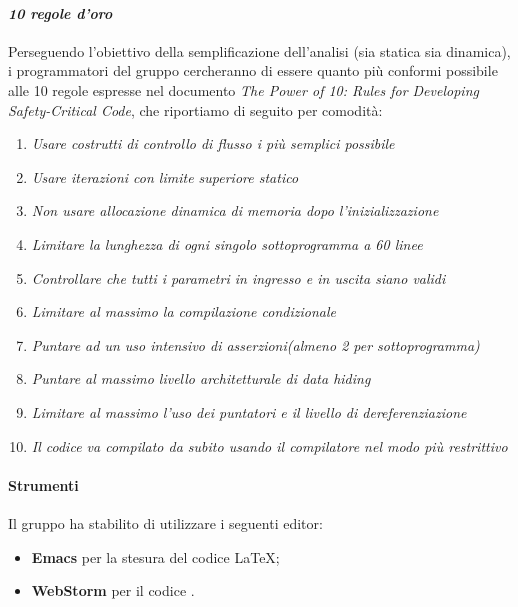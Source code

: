 		\paragraph*{\textit{10 regole d'oro}}
		Perseguendo l'obiettivo della semplificazione dell'analisi (sia statica sia dinamica),
           	i programmatori del gruppo cercheranno di essere quanto più conformi possibile alle 10 regole
           	espresse nel documento \textit{The Power of 10: Rules for Developing Safety-Critical Code}, che riportiamo di seguito per comodità:
                	\begin{enumerate}
                        	\item \textit{Usare costrutti di controllo di flusso i più semplici possibile}
                        	\item \textit{Usare iterazioni con limite superiore statico}
                        	\item \textit{Non usare allocazione dinamica di memoria dopo l'inizializzazione}
                        	\item \textit{Limitare la lunghezza di ogni singolo sottoprogramma a 60 linee}
                        	\item \textit{Controllare che tutti i parametri in ingresso e in uscita siano validi}
                        	\item \textit{Limitare al massimo la compilazione condizionale}
                        	\item \textit{Puntare ad un uso intensivo di asserzioni(almeno 2 per sottoprogramma)}
                        	\item \textit{Puntare al massimo livello architetturale di \textit{data hiding}}
                        	\item \textit{Limitare al massimo l'uso dei puntatori e il livello di dereferenziazione}
                        	\item \textit{Il codice va compilato da subito usando il compilatore nel modo più restrittivo}
			\end{enumerate}

                \paragraph*{Strumenti}
                Il gruppo ha stabilito di utilizzare i seguenti editor:
                \begin{itemize}
                  \item \textbf{Emacs} per la stesura del codice \LaTeX;    %
                  \item \textbf{WebStorm} per il codice .      %
                \end{itemize}
